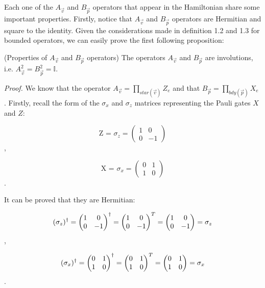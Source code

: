 \documentclass{Configuration_Files/PoliMi3i_thesis}
\begin{document}
Each one of the $A_{\vec{v}}$ and $B_{\vec{p}}$ operators that appear in the Hamiltonian share some important properties. Firstly, notice that $A_{\vec{v}}$ and $B_{\vec{p}}$ operators are Hermitian and square to the identity. Given the considerations made in definition 1.2 and 1.3 for bounded operators, we can easily prove the first following proposition:

\begin{proposition} (Properties of $A_{\vec{v}}$ and $B_{\vec{p}}$ operators)
The operators $A_{\vec{v}}$ and $B_{\vec{p}}$ are involutions, i.e. $A_{\vec{v}}^2= B_{\vec{p}}^2=\mathbb{I}$.
\end{proposition}
	
\textit{Proof.}
We know that the operator $A_{\vec{v}} = \prod_{star(\vec{v})} Z_e$ and that $ B_{\vec{p}} = \prod_{bdy(\vec{p})} X_e  $ .\newline
Firstly, recall the form of the $\sigma_x$ and $\sigma_z$ matrices representing the Pauli gates $X$ and $Z$:



\[
\text{Z = $\sigma_z$} =
\begin{pmatrix}
	1 & 0 \\
	0 & -1
\end{pmatrix}
\],


\[
\text{X = $\sigma_x$} =
\begin{pmatrix}
	0 & 1 \\
	1 & 0
\end{pmatrix}
\].


It can be proved that they are Hermitian:\newline

\[
\text{$( \sigma_z )^{\dagger}$} = 
\begin{pmatrix}
	1 & 0 \\
	0 & -1
\end{pmatrix} ^\dagger =
\begin{pmatrix}
	1 & 0 \\
	0 & -1
\end{pmatrix}^T =
\begin{pmatrix}
	1 & 0 \\
	0 & -1
\end{pmatrix}
= \text{$ \sigma_z $}
\],


\[
\text{$( \sigma_x )^{\dagger}$} = 
\begin{pmatrix}
	0 & 1 \\
	1 & 0
\end{pmatrix} ^\dagger =
\begin{pmatrix}
	0 & 1 \\
	1 & 0
\end{pmatrix}^T =
\begin{pmatrix}
	0 & 1 \\
	1 & 0
\end{pmatrix}
= \text{$ \sigma_x $}
\].\newline
\end{document}
